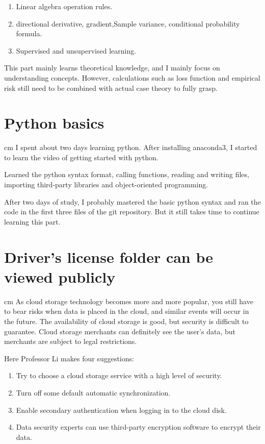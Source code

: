 \begin{enumerate}[1]
  \item Linear algebra operation rules.
  \item directional derivative, gradient,Sample variance, conditional probability formula.
  \item Supervised and unsupervised learning.
\end{enumerate}
This part mainly learns theoretical knowledge, and I mainly focus on understanding concepts. However, calculations such as loss function and empirical risk still need to be combined with actual case theory to fully grasp.

\gliMarker  %


\section{Python basics} \label{sec-method}
 cm%
\setlength{\parindent}{2em}
I spent about two days learning python. After installing anaconda3, I started to learn the video of getting started with python.

Learned the python syntax format, calling functions, reading and writing files, importing third-party libraries and object-oriented programming.

After two days of study, I probably mastered the basic python syntax and ran the code in the first three files of the git repository. But it still takes time to continue learning this part.
\qwuMarker %

\section{Driver's license folder can be viewed publicly} \label{sec-experiment}
 cm%
As cloud storage technology becomes more and more popular, you still have to bear risks when data is placed in the cloud, and similar events will occur in the future. The availability of cloud storage is good, but security is difficult to guarantee. Cloud storage merchants can definitely see the user's data, but merchants are subject to legal restrictions.

Here Professor Li makes four suggestions:

\begin{enumerate}[1]
  \item Try to choose a cloud storage service with a high level of security.
  \item Turn off some default automatic synchronization.
  \item Enable secondary authentication when logging in to the cloud disk.
  \item Data security experts can use third-party encryption software to encrypt their data.
\end{enumerate}

